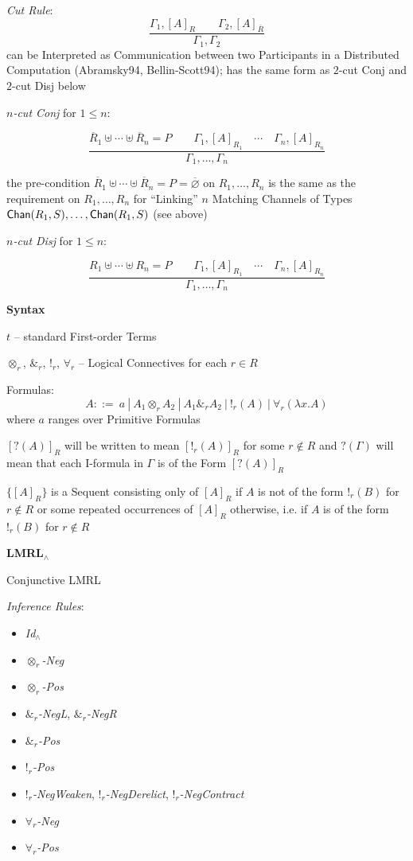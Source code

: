 \emph{Cut Rule}:
\[
  \frac{
    \Gamma_1,[A]_R \quad\quad \Gamma_2,[A]_{\overline{R}}
  }{
    \Gamma_1,\Gamma_2
  }
\]
can be Interpreted as Communication between two Participants in a
Distributed Computation (Abramsky94, Bellin-Scott94); has the same
form as $2$-cut Conj and $2$-cut Disj below


\emph{$n$-cut Conj} for $1 \leq n$:

\[
  \frac{
    \overline{R}_1 \uplus \cdots \uplus \overline{R}_n = P \quad\quad
      \Gamma_1,[A]_{R_1} \quad \cdots \quad \Gamma_n,[A]_{R_n}
  }{
    \Gamma_1, \ldots, \Gamma_n
  }
\]

the pre-condition $\overline{R}_1 \uplus \cdots \uplus \overline{R}_n
= P = \overline{\varnothing}$ on $R_1, \ldots, R_n$ is the same as the
requirement on $R_1, \ldots, R_n$ for ``Linking'' $n$ Matching
Channels of Types $\mathsf{Chan}(R_1,S), \ldots, \mathsf{Chan}(R_1,S)$ (see above)


\emph{$n$-cut Disj} for $1 \leq n$:

\[
  \frac{
    R_1 \uplus \cdots \uplus R_n = P \quad\quad
      \Gamma_1,[A]_{R_1} \quad \cdots \quad \Gamma_n,[A]_{R_n}
  }{
    \Gamma_1, \ldots, \Gamma_n
  }
\]


\textbf{Syntax}

$t$ -- standard First-order Terms

$\otimes_r$, $\&_r$, $!_r$, $\forall_r$ -- Logical Connectives for
each $r \in R$

Formulas:
\[
  A ::=\ a \ |\ A_1 \otimes_r A_2 \ |\ A_1 \&_r A_2 \ |\ !_r(A)
    \ |\ \forall_r(\lambda x.A)
\]
where $a$ ranges over Primitive Formulas

$[?(A)]_R$ will be written to mean $[!_r(A)]_R$ for some $r \notin R$
and $?(\Gamma)$ will mean that each I-formula in $\Gamma$ is of the
Form $[?(A)]_R$

$\{[A]_R\}$ is a Sequent consisting only of $[A]_R$ if $A$ is not of
the form $!_r(B)$ for $r \notin R$ or some repeated occurrences of
$[A]_R$ otherwise, i.e. if $A$ is of the form $!_r(B)$ for $r \notin
R$ %


\textbf{LMRL$_\wedge$}

Conjunctive LMRL

\emph{Inference Rules}:
\begin{itemize}
  \item \emph{Id$_\wedge$}
  \item \emph{$\otimes_r$-Neg}
  \item \emph{$\otimes_r$-Pos}
  \item \emph{$\&_r$-NegL}, \emph{$\&_r$-NegR}
  \item \emph{$\&_r$-Pos}
  \item \emph{$!_r$-Pos}
  \item \emph{$!_r$-NegWeaken}, \emph{$!_r$-NegDerelict},
    \emph{$!_r$-NegContract}
  \item \emph{$\forall_r$-Neg}
  \item \emph{$\forall_r$-Pos}
\end{itemize}

